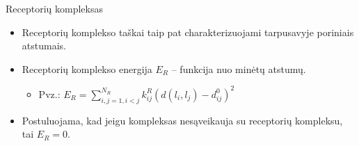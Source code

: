 \documentclass[11pt]{beamer}
\begin{document}
\begin{frame}{Receptorių kompleksas}
\begin{itemize}
\item Receptorių komplekso taškai taip pat charakterizuojami tarpusavyje poriniais atstumais.
\item Receptorių komplekso energija $E_R$  -- funkcija nuo minėtų atstumų.
    \begin{itemize}
       \item Pvz.: $E_R = \sum\limits_{i,j=1,i<j}^{N_R} k_{ij}^R (d(l_i,l_j) - d_{ij}^0)^{2} $
    \end{itemize}
\item Postuluojama, kad jeigu kompleksas nesąveikauja su receptorių kompleksu, tai $E_R = 0$.
\end{itemize}
\end{frame}
\end{document}
